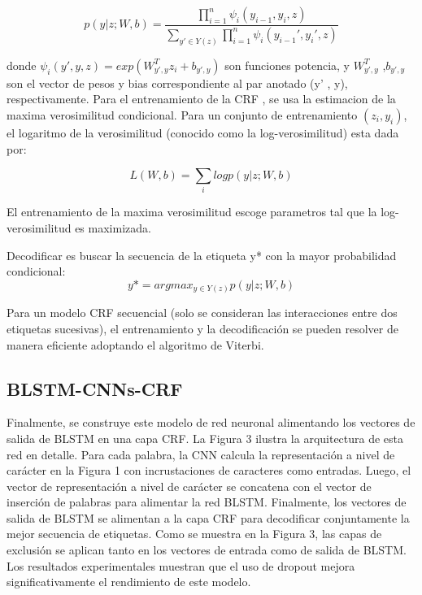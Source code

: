 \documentclass[runningheads]{llncs}
\begin{document}
\begin{equation}
	p(y|z; W, b) =  \frac {\prod_{i=1}^{n} \psi_{i} (y_{i−1}, y_{i} ,z)}
	{\sum_{y' \in Y(z)} \prod_{i=1}^{n} \psi_{i} (y_{i-1}', y_{i}' , z)}
\end{equation}




donde $\psi_{i}(y',y, z) = exp(W_{y',y}^{T} z_{i}+ b_{y',y} )$ son funciones potencia, y $W_{y',y}^{T}$ ,$b_{y',y}$  son  el vector de pesos y bias correspondiente al par anotado (y' , y), respectivamente. Para el entrenamiento de la CRF , se usa la estimacion de la maxima verosimilitud condicional. Para un conjunto de entrenamiento ${(z_{i} , y_{i} )}$, el logaritmo de la verosimilitud (conocido como la log-verosimilitud) esta dada por:

\begin{equation}
	L(W, b) =\sum_{i}{log p(y|z; W, b)}
\end{equation}



El entrenamiento de la maxima verosimilitud escoge parametros tal que la log-verosimilitud es maximizada.

Decodificar es buscar la secuencia de la etiqueta y* con la mayor probabilidad condicional:
\begin{equation}
	y\ast = argmax_{y\in Y(z)} p(y|z; W, b)
\end{equation}


Para un modelo CRF secuencial (solo se consideran las interacciones entre dos etiquetas sucesivas), el entrenamiento y la decodificación se pueden resolver de manera eficiente adoptando el algoritmo de Viterbi.
\subsection{BLSTM-CNNs-CRF}
	
Finalmente, se construye este modelo de red neuronal alimentando los vectores de salida de BLSTM en una capa CRF. La Figura 3 ilustra la arquitectura de esta red en detalle. Para cada palabra, la CNN calcula la representación a nivel de carácter en la Figura 1 con incrustaciones de caracteres como entradas. Luego, el vector de representación a nivel de carácter se concatena con el vector de inserción de palabras para alimentar la red BLSTM. Finalmente, los vectores de salida de BLSTM se alimentan a la capa CRF para decodificar conjuntamente la mejor secuencia de etiquetas. Como se muestra en la Figura 3, las capas de exclusión se aplican tanto en los vectores de entrada como de salida de BLSTM. Los resultados experimentales muestran que el uso de dropout mejora significativamente el rendimiento de este modelo.
\end{document}
